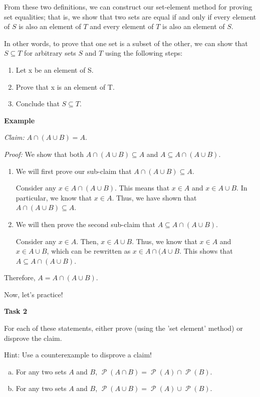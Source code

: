 \documentclass[12pt,letterpaper]{article}
\newcommand\Pow{\ensuremath{\operatorname{\mathcal{P}}}}
\begin{document}
From these two definitions, we can construct our set-element method for proving set equalities; that is, we show that two sets are equal if and only if every element of $S$ is also an element of $T$ and every element of $T$ is also an element of $S$.

In other words, to prove that one set is a subset of the other, we can show that $S \subseteq T$ for arbitrary sets $S$ and $T$ using the following steps:
\begin{enumerate}[1.]
    \item Let x be an element of S.
    \item Prove that x is an element of T.
    \item Conclude that $S \subseteq T$.
\end{enumerate}

\textbf{Example}

\textit{Claim: } $A \cap (A \cup B) = A$.

\textit{Proof: } We show that both $A \cap (A \cup B) \subseteq A$ and $A \subseteq A \cap (A \cup B)$.
\begin{enumerate}
    \item We will first prove our sub-claim that $A \cap (A \cup B) \subseteq A$.
    
    Consider any $x \in A \cap (A \cup B)$. This means that $x \in A$ and $x \in A \cup B$. In particular, we know that $x \in A$. Thus, we have shown that $A \cap (A \cup B) \subseteq A$.
    
    \item We will then prove the second sub-claim that $A \subseteq A \cap (A \cup B)$.
    
    Consider any $x \in A$. Then, $x \in A \cup B$. Thus, we know that $x \in A$ and $x \in A \cup B$, which can be rewritten as $x \in A \cap (A \cup B$. This shows that $A \subseteq A \cap (A \cup B)$.
\end{enumerate}
Therefore, $A = A \cap (A \cup B)$.

Now, let's practice!

\newpage
\textbf{Task 2}

For each of these statements, either prove (using the 'set element' method) or disprove the claim.

Hint: Use a counterexample to disprove a claim!
\begin{enumerate}[a.]
    \item For any two sets $A$ and $B$, $\Pow(A \cap B) = \Pow(A) \cap \Pow(B)$. 
    \begin{mdframed} \vspace{4cm} \end{mdframed}
        

    \item For any two sets $A$ and $B$, $\Pow(A \cup B) = \Pow(A) \cup \Pow(B)$.
    \begin{mdframed} \vspace{4cm} \end{mdframed}
    
    \end{enumerate}
\end{document}
